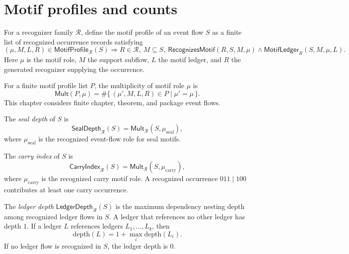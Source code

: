 \section{Motif profiles and counts}
\label{sec:metrics-motif-profiles}

\begin{definition}
\label{def:metrics-motif-profile}
For a recognizer family $\mathcal R$, define the motif profile of an event flow $S$ as a finite list of recognized occurrence records satisfying
$$
  (\mu,M,L,R)\in\mathsf{MotifProfile}_{\mathcal R}(S)
  \Longrightarrow
  R\in\mathcal R,\
  M\subseteq S,\
  \mathsf{RecognizesMotif}(R,S,M,\mu)
  \wedge
  \mathsf{MotifLedger}_{R}(S,M,\mu,L).
$$
Here $\mu$ is the motif role, $M$ the support subflow, $L$ the motif ledger, and $R$ the generated recognizer supplying the occurrence.
\end{definition}

\begin{definition}
\label{def:metrics-motif-multiplicity}
For a finite motif profile list $P$, the multiplicity of motif role $\mu$ is
$$
  \mathsf{Mult}(P,\mu)
  =
  \#\{\,(\mu',M,L,R)\in P\mid \mu'=\mu\,\}.
$$
This chapter considers finite chapter, theorem, and package event flows.
\end{definition}

\begin{definition}
\label{def:metrics-seal-depth}
The \emph{seal depth} of $S$ is
$$
  \mathsf{SealDepth}_{\mathcal R}(S)
  =
  \mathsf{Mult}_{\mathcal R}(S,\mu_{\mathrm{seal}}),
$$
where $\mu_{\mathrm{seal}}$ is the recognized event-flow role for seal motifs.
\end{definition}

\begin{definition}
\label{def:metrics-carry-index}
The \emph{carry index} of $S$ is
$$
  \mathsf{CarryIndex}_{\mathcal R}(S)
  =
  \mathsf{Mult}_{\mathcal R}(S,\mu_{\mathrm{carry}}),
$$
where $\mu_{\mathrm{carry}}$ is the recognized carry motif role. A recognized occurrence $011\mid 100$ contributes at least one carry occurrence.
\end{definition}

\begin{definition}
\label{def:metrics-ledger-depth}
The \emph{ledger depth} $\mathsf{LedgerDepth}_{\mathcal R}(S)$ is the maximum dependency nesting depth among recognized ledger flows in $S$. A ledger that references no other ledger has depth $1$. If a ledger $L$ references ledgers $L_1,\ldots,L_k$, then
$$
  \mathrm{depth}(L)=1+\max_i\mathrm{depth}(L_i).
$$
If no ledger flow is recognized in $S$, the ledger depth is $0$.
\end{definition}

